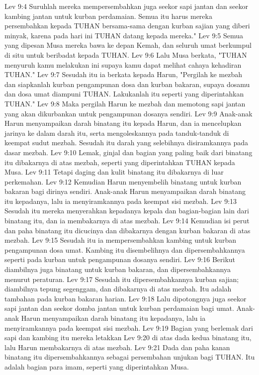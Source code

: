 Lev 9:4  Suruhlah mereka mempersembahkan juga seekor sapi jantan dan seekor kambing jantan untuk kurban perdamaian. Semua itu harus mereka persembahkan kepada TUHAN bersama-sama dengan kurban sajian yang diberi minyak, karena pada hari ini TUHAN datang kepada mereka."
Lev 9:5  Semua yang dipesan Musa mereka bawa ke depan Kemah, dan seluruh umat berkumpul di situ untuk beribadat kepada TUHAN.
Lev 9:6  Lalu Musa berkata, "TUHAN menyuruh kamu melakukan ini supaya kamu dapat melihat cahaya kehadiran TUHAN."
Lev 9:7  Sesudah itu ia berkata kepada Harun, "Pergilah ke mezbah dan siapkanlah kurban pengampunan dosa dan kurban bakaran, supaya dosamu dan dosa umat diampuni TUHAN. Lakukanlah itu seperti yang diperintahkan TUHAN."
Lev 9:8  Maka pergilah Harun ke mezbah dan memotong sapi jantan yang akan dikurbankan untuk pengampunan dosanya sendiri.
Lev 9:9  Anak-anak Harun menyampaikan darah binatang itu kepada Harun, dan ia mencelupkan jarinya ke dalam darah itu, serta mengoleskannya pada tanduk-tanduk di keempat sudut mezbah. Sesudah itu darah yang selebihnya disiramkannya pada dasar mezbah.
Lev 9:10  Lemak, ginjal dan bagian yang paling baik dari binatang itu dibakarnya di atas mezbah, seperti yang diperintahkan TUHAN kepada Musa.
Lev 9:11  Tetapi daging dan kulit binatang itu dibakarnya di luar perkemahan.
Lev 9:12  Kemudian Harun menyembelih binatang untuk kurban bakaran bagi dirinya sendiri. Anak-anak Harun menyampaikan darah binatang itu kepadanya, lalu ia menyiramkannya pada keempat sisi mezbah.
Lev 9:13  Sesudah itu mereka menyerahkan kepadanya kepala dan bagian-bagian lain dari binatang itu, dan ia membakarnya di atas mezbah.
Lev 9:14  Kemudian isi perut dan paha binatang itu dicucinya dan dibakarnya dengan kurban bakaran di atas mezbah.
Lev 9:15  Sesudah itu ia mempersembahkan kambing untuk kurban pengampunan dosa umat. Kambing itu disembelihnya dan dipersembahkannya seperti pada kurban untuk pengampunan dosanya sendiri.
Lev 9:16  Berikut diambilnya juga binatang untuk kurban bakaran, dan dipersembahkannya menurut peraturan.
Lev 9:17  Sesudah itu dipersembahkannya kurban sajian; diambilnya tepung segenggam, dan dibakarnya di atas mezbah. Itu adalah tambahan pada kurban bakaran harian.
Lev 9:18  Lalu dipotongnya juga seekor sapi jantan dan seekor domba jantan untuk kurban perdamaian bagi umat. Anak-anak Harun menyampaikan darah binatang itu kepadanya, lalu ia menyiramkannya pada keempat sisi mezbah.
Lev 9:19  Bagian yang berlemak dari sapi dan kambing itu mereka letakkan
Lev 9:20  di atas dada kedua binatang itu, lalu Harun membakarnya di atas mezbah.
Lev 9:21  Dada dan paha kanan binatang itu dipersembahkannya sebagai persembahan unjukan bagi TUHAN. Itu adalah bagian para imam, seperti yang diperintahkan Musa.
